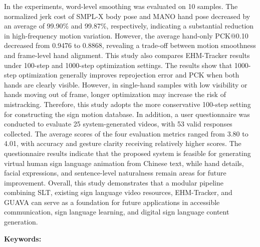 \documentclass[class=NCU_thesis, crop=false]{standalone}
\begin{document}
In the experiments, word-level smoothing was evaluated on 10 samples. The normalized jerk cost of SMPL-X body pose and MANO hand pose decreased by an average of 99.90\% and 99.87\%, respectively, indicating a substantial reduction in high-frequency motion variation. However, the average hand-only PCK@0.10 decreased from 0.9476 to 0.8868, revealing a trade-off between motion smoothness and frame-level hand alignment. This study also compares EHM-Tracker results under 100-step and 1000-step optimization settings. The results show that 1000-step optimization generally improves reprojection error and PCK when both hands are clearly visible. However, in single-hand samples with low visibility or hands moving out of frame, longer optimization may increase the risk of mistracking. Therefore, this study adopts the more conservative 100-step setting for constructing the sign motion database. In addition, a user questionnaire was conducted to evaluate 25 system-generated videos, with 53 valid responses collected. The average scores of the four evaluation metrics ranged from 3.80 to 4.01, with accuracy and gesture clarity receiving relatively higher scores. The questionnaire results indicate that the proposed system is feasible for generating virtual human sign language animation from Chinese text, while hand details, facial expressions, and sentence-level naturalness remain areas for future improvement. Overall, this study demonstrates that a modular pipeline combining SLT, existing sign language video resources, EHM-Tracker, and GUAVA can serve as a foundation for future applications in accessible communication, sign language learning, and digital sign language content generation.

\vspace{2em}
\noindent \textbf{Keywords:} \keywordsEn{} %
\end{document}
